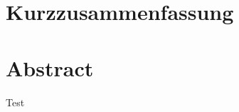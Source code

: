 \documentclass[../main.tex]{subfiles}
\begin{document}
\section*{Kurzzusammenfassung}

\section*{Abstract}

Test
\end{document}
